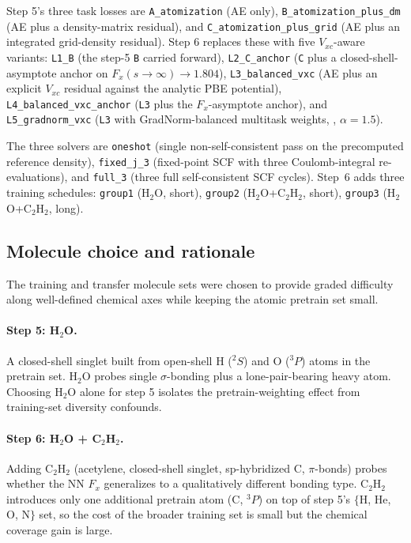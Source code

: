 \documentclass[11pt,letterpaper]{article}
\begin{document}
Step 5's three task losses are \texttt{A\_atomization} (AE only),
\texttt{B\_atomization\_plus\_dm} (AE plus a density-matrix residual),
and \texttt{C\_atomization\_plus\_grid} (AE plus an integrated grid-density
residual). Step 6 replaces these with five $V_{xc}$-aware variants:
\texttt{L1\_B} (the step-5 \texttt{B} carried forward),
\texttt{L2\_C\_anchor} (\texttt{C} plus a closed-shell-asymptote anchor on
$F_x(s\!\to\!\infty)\!\to\!1.804$),
\texttt{L3\_balanced\_vxc} (AE plus an explicit $V_{xc}$ residual against
the analytic PBE potential),
\texttt{L4\_balanced\_vxc\_anchor} (\texttt{L3} plus the
$F_x$-asymptote anchor), and
\texttt{L5\_gradnorm\_vxc} (\texttt{L3} with GradNorm-balanced multitask
weights, \citealp{ChenGradNorm2018}, $\alpha=1.5$).

The three solvers are \texttt{oneshot} (single non-self-consistent pass
on the precomputed reference density), \texttt{fixed\_j\_3} (fixed-point
SCF with three Coulomb-integral re-evaluations), and \texttt{full\_3}
(three full self-consistent SCF cycles). Step~6 adds three training
schedules: \texttt{group1} (H$_2$O, short), \texttt{group2}
(H$_2$O+C$_2$H$_2$, short), \texttt{group3} (H$_2$O+C$_2$H$_2$, long).

\subsection{Molecule choice and rationale}
\label{sec:methods_molecule_rationale}

The training and transfer molecule sets were chosen to provide graded
difficulty along well-defined chemical axes while keeping the atomic
pretrain set small.

\paragraph{Step 5: H$_2$O.} A closed-shell singlet built from open-shell
H ($^2S$) and O ($^3P$) atoms in the pretrain set. H$_2$O probes
single $\sigma$-bonding plus a lone-pair-bearing heavy atom. Choosing
H$_2$O alone for step 5 isolates the pretrain-weighting effect from
training-set diversity confounds.

\paragraph{Step 6: H$_2$O + C$_2$H$_2$.} Adding C$_2$H$_2$ (acetylene,
closed-shell singlet, sp-hybridized C, $\pi$-bonds) probes whether the
NN $F_x$ generalizes to a qualitatively different bonding type. C$_2$H$_2$
introduces only one additional pretrain atom (C, $^3P$) on top of step
5's $\{$H, He, O, N$\}$ set, so the cost of the broader training set is
small but the chemical coverage gain is large.
\end{document}
